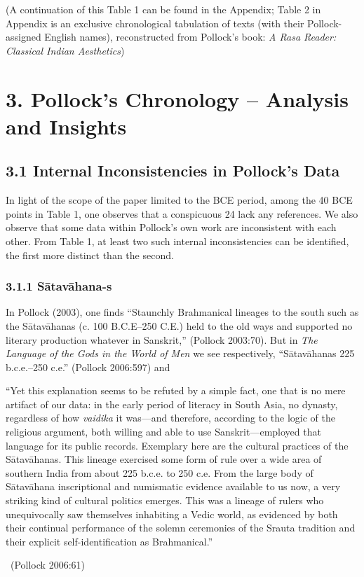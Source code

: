 (A continuation of this Table 1 can be found in the Appendix; Table 2 in Appendix is an exclusive chronological tabulation of texts (with their Pollock-assigned English names), reconstructed from Pollock’s book: \textit{A Rasa Reader: Classical Indian Aesthetics})



\section*{3. Pollock’s Chronology – \hfill\break Analysis and Insights}

\subsection*{3.1 Internal Inconsistencies in Pollock’s Data}

In light of the scope of the paper limited to the BCE period, among the 40 BCE points in Table 1, one observes that a conspicuous 24 lack any references. We also observe that some data within Pollock’s own work are inconsistent with each other. From Table 1, at least two such internal inconsistencies can be identified, the first more distinct than the second.

\subsubsection*{3.1.1 Sātavāhana-s}

In Pollock (2003), one finds “Staunchly Brahmanical lineages to the south such as the Sātavāhanas (c. 100 B.C.E–250 C.E.) held to the old ways and supported no literary production whatever in Sanskrit,” (Pollock 2003:70). But in \textit{The Language of the Gods in the World of Men} we see respectively, “Sātavāhanas 225 b.c.e.–250 c.e.” (Pollock 2006:597) and

\begin{myquote}
“Yet this explanation seems to be refuted by a simple fact, one that is no mere artifact of our data: in the early period of literacy in South Asia, no dynasty, regardless of how \textit{vaidika} it was—and therefore, according to the logic of the religious argument, both willing and able to use Sanskrit—employed that language for its public records. Exemplary here are the cultural practices of the Sātavāhanas. This lineage exercised some form of rule over a wide area of southern India from about 225 b.c.e. to 250 c.e. From the large body of Sātavāhana inscriptional and numismatic evidence available to us now, a very striking kind of cultural politics emerges. This was a lineage of rulers who unequivocally saw themselves inhabiting a Vedic world, as evidenced by both their continual performance of the solemn ceremonies of the Srauta tradition and their explicit self-identification as Brahmanical.” 

~\hfill (Pollock 2006:61)
\end{myquote}


